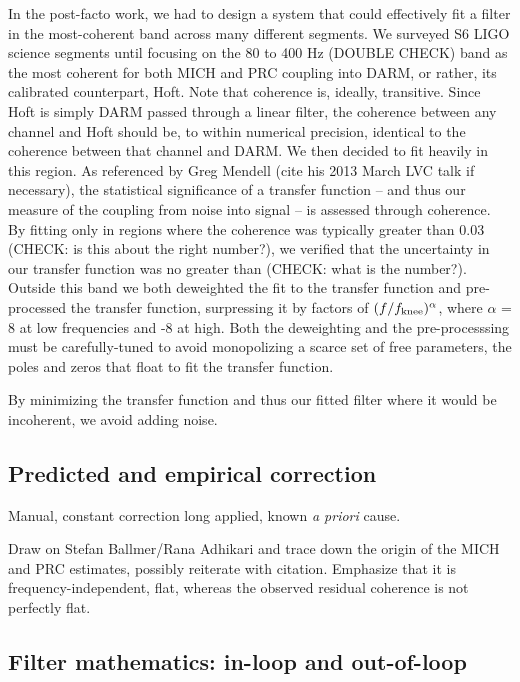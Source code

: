 	In the post-facto work, we had to design a system that could effectively fit a filter in the most-coherent band across many different segments. We surveyed S6 LIGO science segments until focusing on the 80 to 400 Hz (DOUBLE CHECK) band as the most coherent for both MICH and PRC coupling into DARM, or rather, its calibrated counterpart, Hoft. Note that coherence is, ideally, transitive. Since Hoft is simply DARM passed through a linear filter, the coherence between any channel and Hoft should be, to within numerical precision, identical to the coherence between that channel and DARM. We then decided to fit heavily in this region. As referenced by Greg Mendell (cite his 2013 March LVC talk if necessary), the statistical significance of a transfer function -- and thus our measure of the coupling from noise into signal -- is assessed through coherence. By fitting only in regions where the coherence was typically greater than 0.03 (CHECK: is this about the right number?), we verified that the uncertainty in our transfer function was no greater than (CHECK: what is the number?). Outside this band we both deweighted the fit to the transfer function and pre-processed the transfer function, surpressing it by factors of $(f/f_\textup{knee})^\alpha$, where $\alpha$ = 8 at low frequencies and -8 at high. Both the deweighting and the pre-processsing must be carefully-tuned to avoid monopolizing a scarce set of free parameters, the poles and zeros that float to fit the transfer function.

By minimizing the transfer function and thus our fitted filter where it would be incoherent, we avoid adding noise.

        \subsection{Predicted and empirical correction}
        \label{correction}

            Manual, constant correction long applied, known \textit{a priori} cause.

            Draw on Stefan Ballmer/Rana Adhikari and trace down the origin of the MICH and PRC estimates, possibly reiterate with citation. Emphasize that it is frequency-independent, flat, whereas the observed residual coherence is not perfectly flat.

        \subsection{Filter mathematics: in-loop and out-of-loop}
        \label{filter_math}

